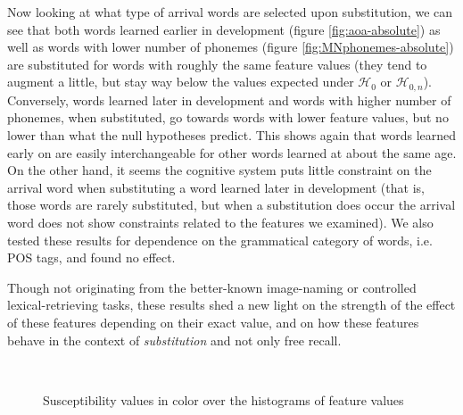 Now looking at what type of arrival words are selected upon substitution, we can see that both words learned earlier in development (figure \ref{fig:aoa-absolute}) as well as words with lower number of phonemes (figure \ref{fig:MNphonemes-absolute}) are substituted for words with roughly the same feature values (they tend to augment a little, but stay way below the values expected under $\mathcal{H}_0$ or $\mathcal{H}_{0,n}$). Conversely, words learned later in development and words with higher number of phonemes, when substituted, go towards words with lower feature values, but no lower than what the null hypotheses predict. This shows again that words learned early on are easily interchangeable for other words learned at about the same age. On the other hand, it seems the cognitive system puts little constraint on the arrival word when substituting a word learned later in development (that is, those words are rarely substituted, but when a substitution does occur the arrival word does not show constraints related to the features we examined). We also tested these results for dependence on the grammatical category of words, i.e. POS tags, and found no effect.

Though not originating from the better-known image-naming or controlled lexical-retrieving tasks, these results shed a new light on the strength of the effect of these features depending on their exact value, and on how these features behave in the context of \emph{substitution} and not only free recall.


\begin{figure}[!th]
	\centering
	~
	\caption{Susceptibility values in color over the histograms of feature values}
\end{figure}


